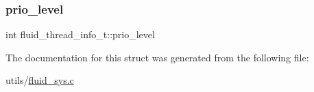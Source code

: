 \mbox{\label{structfluid__thread__info__t_a8347d1eb4166efef3f782b2b1fe15b76}} 
\subsubsection{\texorpdfstring{prio\+\_\+level}{prio\_level}}
{\footnotesize\ttfamily int fluid\+\_\+thread\+\_\+info\+\_\+t\+::prio\+\_\+level}



The documentation for this struct was generated from the following file\+:\begin{DoxyCompactItemize}
\item 
utils/\hyperlink{fluid__sys_8c}{fluid\+\_\+sys.\+c}\end{DoxyCompactItemize}
